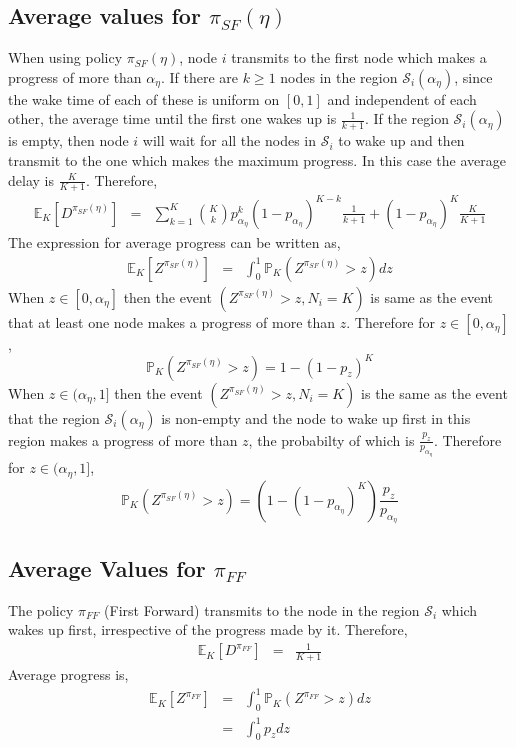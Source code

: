 \documentclass[onecolumn]{IEEEtran}
\begin{document}
\subsection{Average values for $\pi_{SF}(\eta)$}
When using policy $\pi_{SF}(\eta)$, node $i$ transmits to the first node which makes a progress of more than $\alpha_\eta$. If there are $k\ge1$ nodes in the  region $\mathcal{S}_i(\alpha_\eta)$, since the wake time of each of these is uniform on $[0,1]$ and independent of each other, the average time until the first one wakes up is $\frac{1}{k+1}$. If the region   $\mathcal{S}_i(\alpha_\eta)$ is empty, then node $i$ will wait for all the nodes in $\mathcal{S}_i$ to wake up and then transmit to the one which makes the maximum progress. In this case the average delay is $\frac{K}{K+1}$. Therefore,
 \begin{eqnarray}
        \label{expdelay1_equn}
 	\mathbb{E}_K[D^{\pi_{SF}(\eta)}]&=& \sum_{k=1}^{K}{ K \choose k }p_{\alpha_\eta}^k(1-p_{\alpha_\eta})^{K-k}\frac{1}{k+1}
	 + {(1-p_{\alpha_\eta})}^{K}\frac{K}{K+1}
 \end{eqnarray}
The expression for average progress can be written as,
\begin{eqnarray}
	\mathbb{E}_K[Z^{\pi_{SF}(\eta)}]&=&\int_0^1\mathbb{P}_K(Z^{\pi_{SF}(\eta)}>z)dz
\end{eqnarray}
When $z\in[0,\alpha_\eta]$ then  the event $(Z^{\pi_{SF}(\eta)}>z,N_i=K)$ is same as the event that at least one node makes a progress of more than $z$. 
Therefore for $z\in[0,\alpha_\eta]$,
\begin{equation}
\mathbb{P}_K(Z^{\pi_{SF}(\eta)}>z)=1-{(1-p_z)}^K
\end{equation}
When $z\in(\alpha_\eta,1]$ then the event $(Z^{\pi_{SF}(\eta)}>z,N_i=K)$ is the same as the event that the region $\mathcal{S}_i(\alpha_\eta)$ is non-empty and the node to wake up first in this region makes a progress of more than $z$, the probabilty of which is $\frac{p_z}{p_{\alpha_\eta}}$.
Therefore for $z\in(\alpha_\eta,1]$,
\begin{equation}
\mathbb{P}_K(Z^{\pi_{SF}(\eta)}>z)=\left(1-{(1-p_{\alpha_\eta})}^K\right)\frac{p_z}{p_{\alpha_\eta}}
\end{equation}
\subsection{Average Values for $\pi_{FF}$}
The policy $\pi_{FF}$ (First Forward) transmits to the node in the region $\mathcal{S}_i$ which wakes up first, irrespective of the progress made by it. Therefore,
\begin{eqnarray}
	\mathbb{E}_K[D^{\pi_{FF}}]&=& \frac{1}{K+1}
\end{eqnarray}
Average progress is,
\begin{eqnarray}
	\mathbb{E}_K[Z^{\pi_{FF}}]&=&\int_0^1\mathbb{P}_K(Z^{\pi_{FF}}>z)dz\nonumber\\
	&=&\int_0^1 p_z dz
\end{eqnarray}
\end{document}
